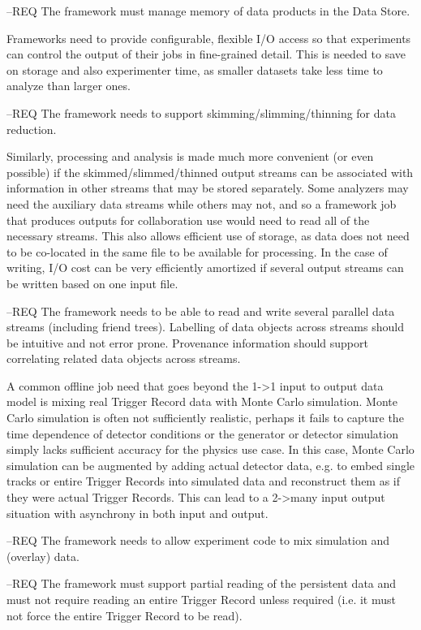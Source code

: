 \documentclass[../main-v1.tex]{subfiles}
\begin{document}
--REQ The framework must manage memory of data products in the Data Store.

Frameworks need to provide configurable, flexible I/O access so that experiments can control the output of their jobs in fine-grained detail.  This is needed to save on storage and also experimenter time, as smaller datasets take less time to analyze than larger ones.
 
--REQ The framework needs to support skimming/slimming/thinning for data reduction.

Similarly, processing and analysis is made much more convenient (or even possible) if the skimmed/slimmed/thinned output streams can be associated with information in other streams that may be stored separately.  Some analyzers may need the auxiliary data streams while others may not, and so a framework job that produces outputs for collaboration use would need to read all of the necessary streams.  This also allows efficient use of storage, as data does not need to be co-located in the same file to be available for processing.  In the case of writing, I/O cost can be very efficiently amortized if several output streams can be written based on one input file.

--REQ The framework needs to be able to read and write several parallel data streams (including friend trees).  Labelling of data objects across streams should be intuitive and not error prone.  Provenance information should support correlating related data objects across streams.

A common offline job need that goes beyond the 1->1 input to output data model is mixing real Trigger Record data with Monte Carlo simulation.  Monte Carlo simulation is often not sufficiently realistic, perhaps it fails to capture the time dependence of detector conditions or the generator or detector simulation simply lacks sufficient accuracy for the physics use case.  In this case, Monte Carlo simulation can be augmented by adding actual detector data, e.g. to embed single tracks or entire Trigger Records into simulated data and reconstruct them as if they were actual Trigger Records.  This can lead to a 2->many input output situation with asynchrony in both input and output. 

--REQ The framework needs to allow experiment code to mix simulation and (overlay) data.


--REQ The framework must support partial reading of the persistent data and must not require reading an entire Trigger Record unless required (i.e. it must not force the entire Trigger Record to be read).
\end{document}
